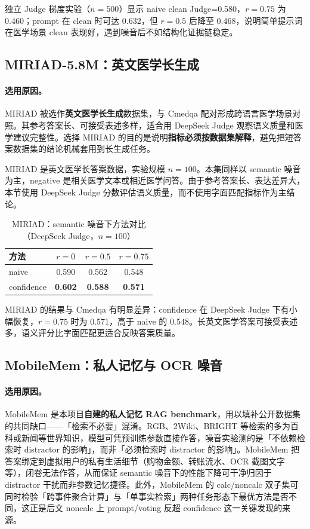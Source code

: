 \documentclass[UTF8,zihao=-4]{ctexart}
\begin{document}
独立 Judge 梯度实验（$n=500$）显示 naive clean Judge=0.580，$r=0.75$ 为 0.460；prompt 在 clean 时可达 0.632，但 $r=0.5$ 后降至 0.468，说明简单提示词在医学场景 clean 表现好，遇到噪音后不如结构化证据链稳定。

\subsection{MIRIAD-5.8M：英文医学长生成}

\paragraph{选用原因。} MIRIAD 被选作\textbf{英文医学长生成}数据集，与 Cmedqa 配对形成跨语言医学场景对照。其参考答案长、可接受表述多样，适合用 DeepSeek Judge 观察语义质量和医学建议完整性。选择 MIRIAD 的目的是说明\textbf{指标必须按数据集解释}，避免把短答案数据集的结论机械套用到长生成任务。

MIRIAD 是英文医学长答案数据，实验规模 $n=100$。本集同样以 semantic 噪音为主，negative 是相关医学文本或相近医学问答。由于参考答案长、表达差异大，本节使用 DeepSeek Judge 分数评估语义质量，而不使用字面匹配指标作为主结论。

\begin{table}[H]
  \centering
  \caption{MIRIAD：semantic 噪音下方法对比（DeepSeek Judge，$n=100$）}
  \begin{tabular}{lccc}
    \toprule
    方法 & $r=0$ & $r=0.5$ & $r=0.75$ \\
    \midrule
    naive & 0.590 & 0.562 & 0.548 \\
    confidence & \textbf{0.602} & \textbf{0.588} & \textbf{0.571} \\
    \bottomrule
  \end{tabular}
\end{table}

MIRIAD 的结果与 Cmedqa 有明显差异：confidence 在 DeepSeek Judge 下有小幅恢复，$r=0.75$ 时为 0.571，高于 naive 的 0.548。长英文医学答案可接受表述多，语义评分比字面匹配更适合反映答案质量。

\subsection{MobileMem：私人记忆与 OCR 噪音}

\paragraph{选用原因。} MobileMem 是本项目\textbf{自建的私人记忆 RAG benchmark}，用以填补公开数据集的共同缺口——「检索不必要」混淆。RGB、2Wiki、BRIGHT 等检索的多为百科或新闻等世界知识，模型可凭预训练参数直接作答，噪音实验测的是「不依赖检索时 distractor 的影响」，而非「必须检索时 distractor 的影响」。MobileMem 把答案绑定到虚拟用户的私有生活细节（购物金额、转账流水、OCR 截图文字等），闭卷无法作答，从而保证 semantic 噪音下的性能下降可干净归因于 distractor 干扰而非参数记忆捷径。此外，MobileMem 的 calc/noncalc 双子集可同时检验「跨事件聚合计算」与「单事实检索」两种任务形态下最优方法是否不同，这正是后文 noncalc 上 prompt/voting 反超 confidence 这一关键发现的来源。
\end{document}

